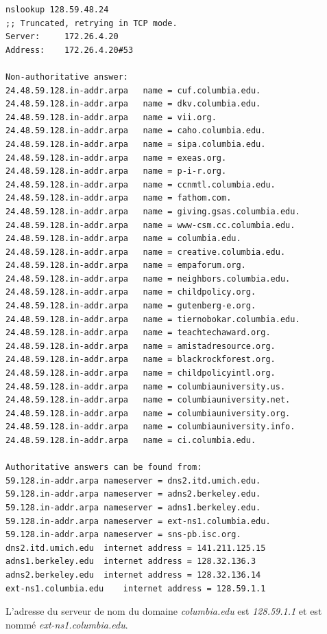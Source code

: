 \documentclass[a4paper,10pt]{article}
\begin{document}
\begin{enumerate}
\begin{verbatim}
nslookup 128.59.48.24
;; Truncated, retrying in TCP mode.
Server:		172.26.4.20
Address:	172.26.4.20#53

Non-authoritative answer:
24.48.59.128.in-addr.arpa	name = cuf.columbia.edu.
24.48.59.128.in-addr.arpa	name = dkv.columbia.edu.
24.48.59.128.in-addr.arpa	name = vii.org.
24.48.59.128.in-addr.arpa	name = caho.columbia.edu.
24.48.59.128.in-addr.arpa	name = sipa.columbia.edu.
24.48.59.128.in-addr.arpa	name = exeas.org.
24.48.59.128.in-addr.arpa	name = p-i-r.org.
24.48.59.128.in-addr.arpa	name = ccnmtl.columbia.edu.
24.48.59.128.in-addr.arpa	name = fathom.com.
24.48.59.128.in-addr.arpa	name = giving.gsas.columbia.edu.
24.48.59.128.in-addr.arpa	name = www-csm.cc.columbia.edu.
24.48.59.128.in-addr.arpa	name = columbia.edu.
24.48.59.128.in-addr.arpa	name = creative.columbia.edu.
24.48.59.128.in-addr.arpa	name = empaforum.org.
24.48.59.128.in-addr.arpa	name = neighbors.columbia.edu.
24.48.59.128.in-addr.arpa	name = childpolicy.org.
24.48.59.128.in-addr.arpa	name = gutenberg-e.org.
24.48.59.128.in-addr.arpa	name = tiernobokar.columbia.edu.
24.48.59.128.in-addr.arpa	name = teachtechaward.org.
24.48.59.128.in-addr.arpa	name = amistadresource.org.
24.48.59.128.in-addr.arpa	name = blackrockforest.org.
24.48.59.128.in-addr.arpa	name = childpolicyintl.org.
24.48.59.128.in-addr.arpa	name = columbiauniversity.us.
24.48.59.128.in-addr.arpa	name = columbiauniversity.net.
24.48.59.128.in-addr.arpa	name = columbiauniversity.org.
24.48.59.128.in-addr.arpa	name = columbiauniversity.info.
24.48.59.128.in-addr.arpa	name = ci.columbia.edu.

Authoritative answers can be found from:
59.128.in-addr.arpa	nameserver = dns2.itd.umich.edu.
59.128.in-addr.arpa	nameserver = adns2.berkeley.edu.
59.128.in-addr.arpa	nameserver = adns1.berkeley.edu.
59.128.in-addr.arpa	nameserver = ext-ns1.columbia.edu.
59.128.in-addr.arpa	nameserver = sns-pb.isc.org.
dns2.itd.umich.edu	internet address = 141.211.125.15
adns1.berkeley.edu	internet address = 128.32.136.3
adns2.berkeley.edu	internet address = 128.32.136.14
ext-ns1.columbia.edu	internet address = 128.59.1.1
\end{verbatim}
L'adresse du serveur de nom du domaine \textit{columbia.edu} est \textit{128.59.1.1} et est nommé \textit{ext-ns1.columbia.edu}.
\end{enumerate}
\end{document}

